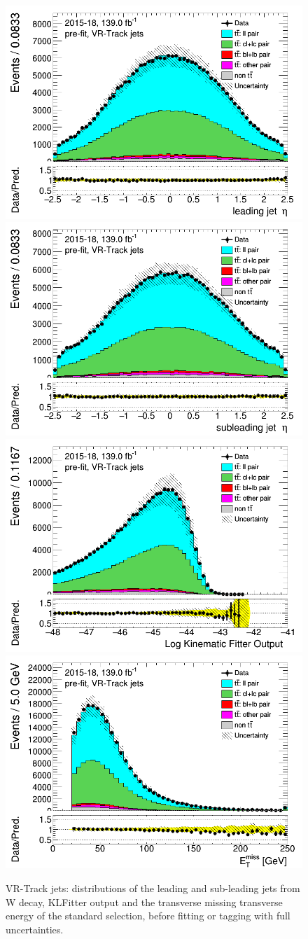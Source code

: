 \documentclass[letterpaper,12pt]{article}
\begin{document}
\newpage	
\begin{figure}[H]
\includegraphics[width=.45\textwidth]{FTAG_plots/pretagNoRwwithouthighpTVRJetsall/DataMC_h_J0_etatrackjet.png}
\includegraphics[width=.45\textwidth]{FTAG_plots/pretagNoRwwithouthighpTVRJetsall/DataMC_h_J1_etatrackjet.png}\\
\includegraphics[width=.45\textwidth]{FTAG_plots/pretagNoRwwithouthighpTVRJetsall/DataMC_h_LLRtrackjet.png}
\includegraphics[width=.45\textwidth]{FTAG_plots/pretagNoRwwithouthighpTVRJetsall/DataMC_h_METtrackjet.png}\\

\caption{VR-Track jets: distributions of the leading and sub-leading jets 
from W decay, KLFitter output and the transverse missing transverse 
energy of the standard selection, before fitting or tagging with 
full uncertainties.} \label{fig:standard_jets_VRJets}
\end{figure}
\end{document}
